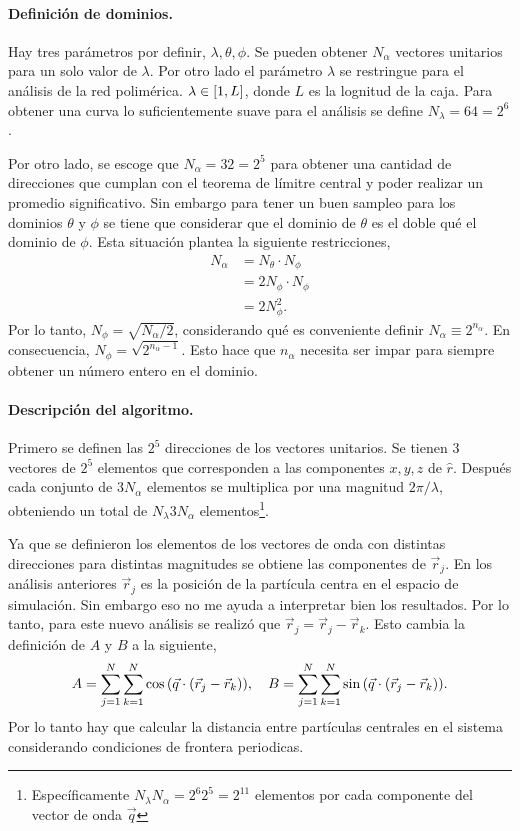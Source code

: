 \documentclass[../main.tex]{subfiles}
\begin{document}
\paragraph{Definición de dominios.}
Hay tres parámetros por definir, \(\lambda,\theta,\phi\).
Se pueden obtener $N_{\alpha}$ vectores unitarios para un solo valor de \(\lambda\).
Por otro lado el parámetro \(\lambda\) se restringue para el análisis de la red polimérica.
\(\lambda\in\qty[1,L]\), donde \(L\) es la lognitud de la caja.
Para obtener una curva lo suficientemente suave para el análisis se define \(N_{\lambda}=64=2^{6}\).

Por otro lado, se escoge que \(N_{\alpha}=32=2^5\) para obtener una cantidad de direcciones que cumplan con el teorema de límitre central y poder realizar un promedio significativo. 
Sin embargo para tener un buen sampleo para los dominios \(\theta\) y \(\phi\) se tiene que considerar que el dominio de \(\theta\) es el doble qué el dominio de \(\phi\).
Esta situación plantea la siguiente restricciones,
\begin{align*}
    N_{\alpha} &=N_{\theta} \cdot N_{\phi} \\
               &=2N_{\phi} \cdot N_{\phi} \\ 
               &=2N^{2}_{\phi}.
\end{align*}
Por lo tanto, \(N_{\phi} = \sqrt{N_{\alpha}/2}\), considerando qué es conveniente definir \(N_{\alpha}\equiv 2^{n_{\alpha}}\).
En consecuencia, \(N_{\phi} = \sqrt{2^{n_{\alpha}-1}}\).
Esto hace que \(n_{\alpha}\) necesita ser impar para siempre obtener un número entero en el dominio.

\paragraph{Descripción del algoritmo.}
Primero se definen las \(2^{5}\) direcciones de los vectores unitarios.
Se tienen 3 vectores de \(2^{5}\) elementos que corresponden a las componentes \(x,y,z\) de \(\hat{r}\).
Después cada conjunto de \(3N_{\alpha}\) elementos se multiplica por una magnitud \(2\pi/\lambda\), obteniendo un total de \(N_{\lambda}3N_{\alpha}\) elementos\footnote{Específicamente \(N_{\lambda}N_{\alpha}=2^{6}2^{5}=2^{11}\) elementos por cada componente del vector de onda \(\vec{q}\)}.

Ya que se definieron los elementos de los vectores de onda con distintas direcciones para distintas magnitudes se obtiene las componentes de \(\vec{r}_{j}\).
En los análisis anteriores \(\vec{r}_{j}\) es la posición de la partícula centra en el espacio de simulación.
Sin embargo eso no me ayuda a interpretar bien los resultados.
Por lo tanto, para este nuevo análisis se realizó que \(\vec{r}_{j} = \vec{r}_{j}-\vec{r}_{k}\).
Esto cambia la definición de \(A\) y \(B\) a la siguiente,
\begin{gather*}
    A = \sum_{j=1}^{N}\sum_{k=1}^{N}\cos\qty(\vec{q}\cdot\qty(\vec{r}_{j}-\vec{r}_{k})),\quad
    B = \sum_{j=1}^{N}\sum_{k=1}^{N}\sin\qty(\vec{q}\cdot\qty(\vec{r}_{j}-\vec{r}_{k})).
\end{gather*}
Por lo tanto hay que calcular la distancia entre partículas centrales en el sistema considerando condiciones de frontera periodicas.
\end{document}
